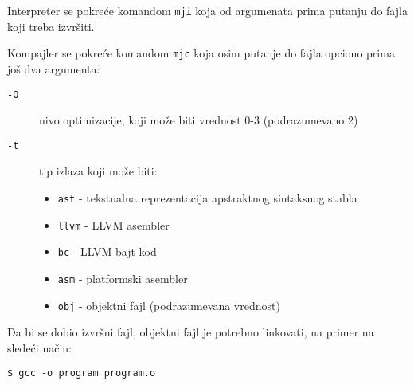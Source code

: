 Interpreter se pokreće komandom \texttt{mji} koja od argumenata prima putanju do fajla koji treba izvršiti.

Kompajler se pokreće komandom \texttt{mjc} koja osim putanje do fajla opciono prima još dva argumenta:
\begin{description}
\item[\texttt{-O}] nivo optimizacije, koji može biti vrednost 0-3 (podrazumevano 2)
\item[\texttt{-t}] tip izlaza koji može biti:

\begin{itemize}
    \item \texttt{ast} - tekstualna reprezentacija apstraktnog sintaksnog stabla
    \item \texttt{llvm} - LLVM asembler
    \item \texttt{bc} - LLVM bajt kod
    \item \texttt{asm} - platformski asembler
    \item \texttt{obj} - objektni fajl (podrazumevana vrednost)
\end{itemize}
\end{description}

Da bi se dobio izvršni fajl, objektni fajl je potrebno linkovati, na primer na sledeći način:

\begin{lstlisting}
$ gcc -o program program.o
\end{lstlisting}
